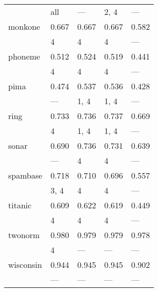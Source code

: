 \begin{tabular}{lllll}
                  & all   & ---   & 2, 4  & ---   \\
 monkone          & 0.667 & 0.667 & 0.667 & 0.582 \\
                  & 4     & 4     & 4     & ---   \\
 phoneme          & 0.512 & 0.524 & 0.519 & 0.441 \\
                  & 4     & 4     & 4     & ---   \\
 pima             & 0.474 & 0.537 & 0.536 & 0.428 \\
                  & ---   & 1, 4  & 1, 4  & ---   \\
 ring             & 0.733 & 0.736 & 0.737 & 0.669 \\
                  & 4     & 1, 4  & 1, 4  & ---   \\
 sonar            & 0.690 & 0.736 & 0.731 & 0.639 \\
                  & ---   & 4     & 4     & ---   \\
 spambase         & 0.718 & 0.710 & 0.696 & 0.557 \\
                  & 3, 4  & 4     & 4     & ---   \\
 titanic          & 0.609 & 0.622 & 0.619 & 0.449 \\
                  & 4     & 4     & 4     & ---   \\
 twonorm          & 0.980 & 0.979 & 0.979 & 0.978 \\
                  & 4     & ---   & ---   & ---   \\
 wisconsin        & 0.944 & 0.945 & 0.945 & 0.902 \\
                  & ---   & ---   & ---   & ---   \\
\bottomrule
\end{tabular}
